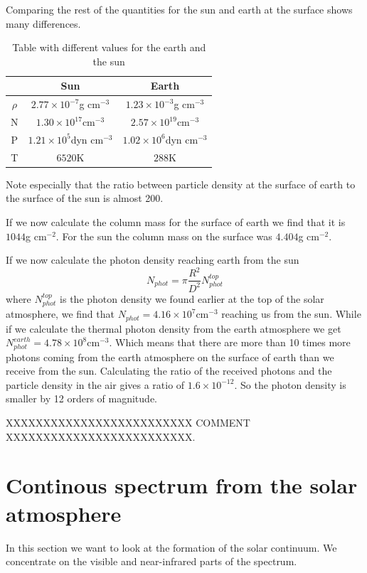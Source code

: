 \documentclass{aa}   %
\begin{document}
Comparing the rest of the quantities for the sun and earth at the surface shows many differences.
\begin{table}
\begin{tabular}{|c|c|c|}
\hline
&Sun & Earth\\
\hline
$\rho$ &$2.77\times 10^{-7}$g cm$^{-3}$ &$1.23\times 10^{-3}$g cm$^{-3}$\\
\hline
N &$1.30\times10^{17}$cm$^{-3}$ &$2.57\times10^{19}$cm$^{-3}$ \\
\hline
P &$1.21\times10^{5}$dyn cm$^{-3}$ &$1.02\times10^{6}$dyn cm$^{-3}$ \\
\hline
T &$6520$K &$288$K\\
\hline
\end{tabular}
\caption{Table with different values for the earth and the sun}
\end{table}
Note especially that the ratio between particle density at the surface of earth to the surface of the sun is almost 200.

If we now calculate the column mass for the surface of earth we find that it is $1044$g cm$^{-2}$. For the sun the column mass on the surface was $4.404$g cm$^{-2}$.

If we now calculate the photon density reaching earth from the sun
\begin{equation}
 N_{phot} = \pi \frac{R^2}{D^2}N_{phot}^{top}
\end{equation}
where $N_{phot}^{top}$ is the photon density we found earlier at the top of the solar atmosphere, we find that $N_{phot} = 4.16\times10^{7}$cm$^{-3}$ reaching us from the sun.
While if we calculate the thermal photon density from the earth atmosphere we get $N_{phot}^{earth} = 4.78\times 10^8$cm$^{-3}$. Which means that there are more than 10 times more photons coming from the earth atmosphere on the surface of earth than we receive from the sun. Calculating the ratio of the received photons and the particle density in the air gives a ratio of $1.6\times 10^{-12}$. So the photon density is smaller by 12 orders of magnitude.

XXXXXXXXXXXXXXXXXXXXXXXXX COMMENT XXXXXXXXXXXXXXXXXXXXXXXXX.

\section{Continous spectrum from the solar atmosphere}
In this section we want to look at the formation of the solar continuum. We concentrate on the visible and near-infrared parts of the spectrum.
\end{document}
